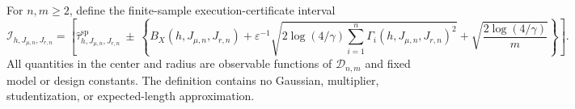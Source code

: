 For \(n,m\ge2\), define the finite-sample execution-certificate interval
\[
\mathcal I_{h,J_{\mu,n},J_{r,n}}
=\left[
\widehat\tau^{\mathrm{sp}}_{h,J_{\mu,n},J_{r,n}}
\ \pm\ 
\left\{
B_X(h,J_{\mu,n},J_{r,n})
+\varepsilon^{-1}\sqrt{2\log(4/\gamma)\sum_{i=1}^n\Gamma_i(h,J_{\mu,n},J_{r,n})^2}
+\sqrt{\frac{2\log(4/\gamma)}m}
\right\}
\right].
\]
All quantities in the center and radius are observable functions of \(\mathcal D_{n,m}\) and fixed model or design constants. The definition contains no Gaussian, multiplier, studentization, or expected-length approximation.